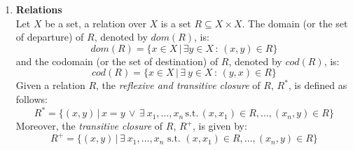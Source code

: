 \begin{enumerate}
\begin{itemize}
\begin{itemize}
        \noindent $C_2 \ominus C_1 = %
        (
        \{ r^1_1.(n_1,m^1_1), \ldots, r^1_{i_{n_{1}}}.(n_1,m^1_{i_{n_{1}}}),
        \ldots,
        r^l_1.(n_l,m^l_1), \ldots,(r^l_{j} - 1).(n_l,m^l_j),\\
        \ldots,
        r^l_{i_{n_{l}}}.(n_l,m^l_{i_{n_{l}}}), 
        \ldots, r^k_1.(n_k,m^k_1),\ldots, r^k_{i_{n_{k}}}.(n_k,m^k_{i_{n_{k}}}) \}
        ) 
        \ominus (C_1 - \{ 1.(n_l,m) \})
        $.

        Thus, $C_2 \ominus C_1$ is obtained by removing from $C_2$ 
        elements $(n,m)$ that correspond to elements $(n,m')$ of $C_1$,
        such that $m$ is the largest value with $m\leq m'$.

        \vspace*{0.12cm}

        For instance, taking $C_1 = \{
             1.(2,3), 1.(2,5), 1.(1,4), 1.(7,6)
        \}$, and $C_2 = $ \linebreak
        $\{
             1.(2,0), 1.(2,1), 1.(2,2), 1.(1,3), 2.(7,6), 3.(3,3)
        \}$ it follows that $C_1 \preceq C_2$. Then,
        $C_2 \ominus C_1= \{
            1.(2,0), 1.(7,6), 3.(3,3)
        \}$.
  \end{itemize} 
\end{itemize}

These timed multiset operations are related with the definition of binding and firing for coloured Petri nets.

\item {\bf Relations}\\
Let $X$ be a set, a relation over $X$ is a set $R \subseteq X \times X$. 
The domain (or the set of departure) of $R$, denoted by $dom(R)$, is:
\[dom(R) = \{ x \in X \,|\, \exists
y \in X\,:\, (x,y) \in R \}\]
and the codomain (or the set of destination) of $R$, denoted by $cod(R)$, is:
\[cod(R) = \{ x \in X \,|\, \exists\ y \in X\,:\,(y,x) \in R\}\]
Given a relation $R$, the {\it reflexive and transitive closure} of $R$, $R^*$, is defined as follows:
\[ R^* = \{ (x,y)\,|\,x=y \,\vee\,
\exists\ x_1,\ldots,x_n\, \text{s.t.} \,(x,x_1)\in R,\ldots,(x_n,y) \in R\}\]
Moreover, the {\it transitive closure} of $R$, $R^+$, is given by:
\[R^+ = \{ (x,y)\,|\,
\exists \ x_1,\ldots,x_n \text{ s.t. } (x,x_1)\in R,\ldots,(x_n,y) \in R\}\]

\end{enumerate}


